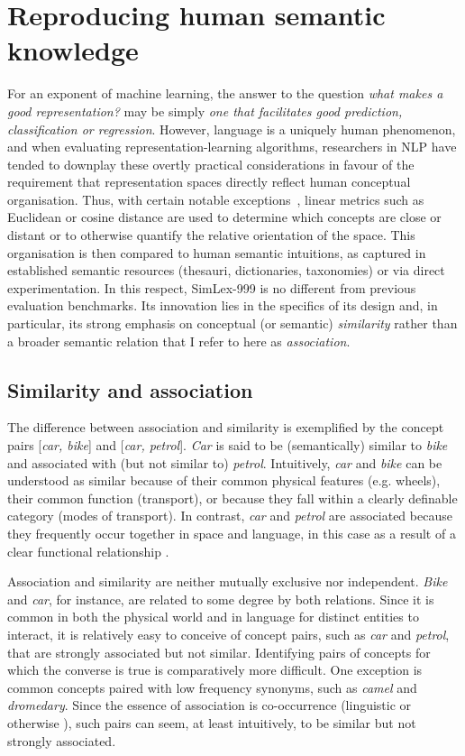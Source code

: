 \section{Reproducing human semantic knowledge}

For an exponent of machine learning, the answer to the question \emph{what makes a good representation?} may be simply \emph{one that facilitates good prediction, classification or regression}. However, language is a uniquely human phenomenon, and when evaluating  representation-learning algorithms, researchers in NLP have tended to downplay these overtly practical considerations in favour of the requirement that representation spaces directly reflect human conceptual organisation. Thus, with certain notable exceptions~\citep{collobert2008unified,turian2010word}, linear metrics such as Euclidean or cosine distance are used to determine which concepts are close or distant or to otherwise quantify the relative orientation of the space. This organisation is then compared to human semantic intuitions, as captured in established semantic resources (thesauri, dictionaries, taxonomies) or via direct experimentation. In this respect, SimLex-999 is no different from previous evaluation benchmarks. Its innovation lies in the specifics of its design and, in particular, its strong emphasis on conceptual (or semantic) \emph{similarity} rather than a broader semantic relation that I refer to here as \emph{association}.  

\subsection{Similarity and association} 

The difference between association and similarity is exemplified by the concept pairs [\emph{car, bike}] and [\emph{car, petrol}]. \emph{Car} is said to be (semantically) similar to \emph{bike} and associated with (but not similar to) \emph{petrol}. Intuitively, \emph{car} and \emph{bike} can be understood as similar because of their common physical features (e.g. wheels), their common function (transport), or because they fall within a clearly definable category (modes of transport). In contrast, \emph{car} and \emph{petrol} are associated because they frequently occur together in space and language, in this case as a result of a clear functional relationship \citep{plaut1995semantic,mcrae2012semantic}. 

Association and similarity are neither mutually exclusive nor independent. \emph{Bike} and \emph{car}, for instance, are related to some degree by both relations. Since it is common in both the physical world and in language for distinct entities to interact, it is relatively easy to conceive of concept pairs, such as \emph{car} and \emph{petrol}, that are strongly associated but not similar. Identifying pairs of concepts for which the converse is true is comparatively more difficult. One exception is common concepts paired with low frequency synonyms, such as \emph{camel} and \emph{dromedary}. Since the essence of association is co-occurrence (linguistic or otherwise \citep{mcrae2012semantic}), such pairs can seem, at least intuitively, to be similar but not strongly associated.  

